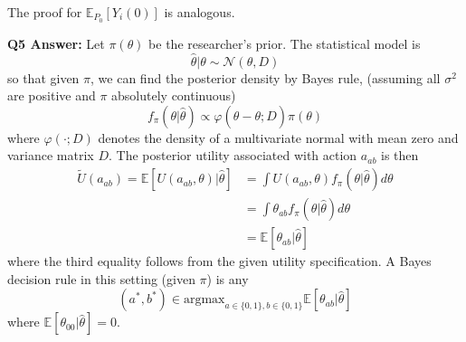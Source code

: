 \documentclass[11pt]{article} %
\begin{document}
The proof for $\mathbb E_{P_0}[Y_i(0)]$ is analogous.

\noindent \textbf{Q5 Answer:} Let $\pi(\theta)$ be the researcher's prior. The
statistical model is 
\[ \hat\theta | \theta \sim \mathcal N(\theta, D)\]
so that given $\pi$, we can find the posterior density by Bayes rule, (assuming all
$\sigma^2$ are positive and $\pi$ absolutely continuous)
\[ f_{\pi}(\theta | \hat\theta) \propto \varphi(\hat\theta - \theta; D) \pi(\theta) \]
where $\varphi(\cdot; D)$ denotes the density of a multivariate normal with mean
zero and variance matrix $D$. The posterior utility associated with action
$a_{ab}$ is then
\[
  \begin{aligned}
    \tilde U(a_{ab}) = \mathbb E[U(a_{ab}, \theta) | \hat\theta] &= \int
    U(a_{ab}, \theta) f_{\pi}(\theta | \hat\theta) d\theta \\
    &= \int \theta_{ab} f_{\pi}(\theta | \hat \theta) d\theta \\
    &= \mathbb E[\theta_{ab} | \hat\theta]
  \end{aligned}
\]
where the third equality follows from the given utility specification. A Bayes
decision rule in this setting (given $\pi$) is any
\[  (a^*, b^*) \in \text{argmax}_{a\in\{0,1\}, b\in\{0,1\}} \mathbb E[\theta_{ab}|\hat\theta] \]
where $\mathbb E[\theta_{00} | \hat\theta] = 0$.
\end{document}
